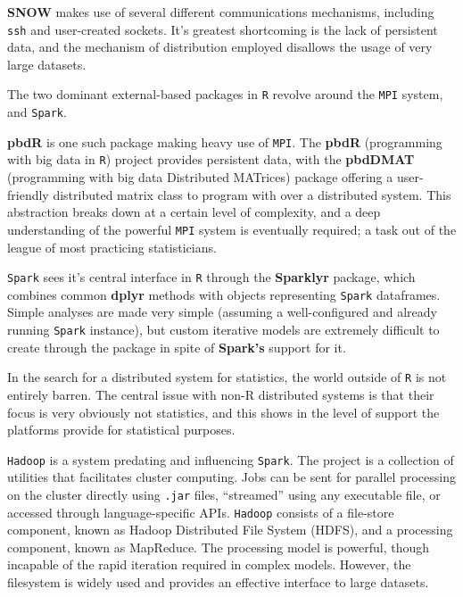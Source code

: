 

\textbf{SNOW} makes use of several different communications mechanisms, including \texttt{ssh} and user-created sockets.
It's greatest shortcoming is the lack of persistent data, and the mechanism of distribution employed disallows the usage of very large datasets.

The two dominant external-based packages in \texttt{R} revolve around the \texttt{MPI} system, and \texttt{Spark}.

\textbf{pbdR} is one such package making heavy use of \texttt{MPI}\cite{pbdR2012}.
The \textbf{pbdR} (programming with big data in \texttt{R}) project provides persistent data, with the \textbf{pbdDMAT} (programming with big data Distributed MATrices) package offering a user-friendly distributed matrix class to program with over a distributed system\cite{pbdDMATpackage}.
This abstraction breaks down at a certain level of complexity, and a deep understanding of the powerful \texttt{MPI} system is eventually required; a task out of the league of most practicing statisticians.

\texttt{Spark} sees it's central interface in \texttt{R} through the \textbf{Sparklyr} package, which combines common \textbf{dplyr} methods with objects representing \texttt{Spark} dataframes\cite{luraschi20}.
Simple analyses are made very simple (assuming a well-configured and already running \texttt{Spark} instance), but custom iterative models are extremely difficult to create through the package in spite of \textbf{Spark's} support for it.

In the search for a distributed system for statistics, the world outside of \texttt{R} is not entirely barren.
The central issue with non-R distributed systems is that their focus is very obviously not statistics, and this shows in the level of support the platforms provide for statistical purposes.

\texttt{Hadoop} is a system predating and influencing \texttt{Spark}\cite{shvachko2010hadoop}.
The project is a collection of utilities that facilitates cluster computing.
Jobs can be sent for parallel processing on the cluster directly using \texttt{.jar} files, ``streamed'' using any executable file, or accessed through language-specific APIs.
\texttt{Hadoop} consists of a file-store component, known as Hadoop Distributed File System (HDFS), and a processing component, known as MapReduce.
The processing model is powerful, though incapable of the rapid iteration required in complex models\cite{zaharia2010spark}.
However, the filesystem is widely used and provides an effective interface to large datasets.

